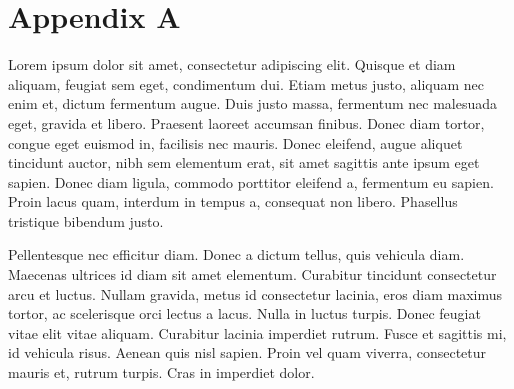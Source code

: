 %
%
%

\section{\label{sec:appendixa}Appendix A}

Lorem ipsum dolor sit amet, consectetur adipiscing elit. Quisque et diam aliquam, feugiat sem eget, condimentum dui.
Etiam metus justo, aliquam nec enim et, dictum fermentum augue. Duis justo massa, fermentum nec malesuada eget, gravida
et libero. Praesent laoreet accumsan finibus. Donec diam tortor, congue eget euismod in, facilisis nec mauris. Donec
eleifend, augue aliquet tincidunt auctor, nibh sem elementum erat, sit amet sagittis ante ipsum eget sapien. Donec diam
ligula, commodo porttitor eleifend a, fermentum eu sapien. Proin lacus quam, interdum in tempus a, consequat non
libero. Phasellus tristique bibendum justo.

Pellentesque nec efficitur diam. Donec a dictum tellus, quis vehicula diam. Maecenas ultrices id diam sit amet
elementum. Curabitur tincidunt consectetur arcu et luctus. Nullam gravida, metus id consectetur lacinia, eros diam
maximus tortor, ac scelerisque orci lectus a lacus. Nulla in luctus turpis. Donec feugiat vitae elit vitae aliquam.
Curabitur lacinia imperdiet rutrum. Fusce et sagittis mi, id vehicula risus. Aenean quis nisl sapien. Proin vel quam
viverra, consectetur mauris et, rutrum turpis. Cras in imperdiet dolor.
